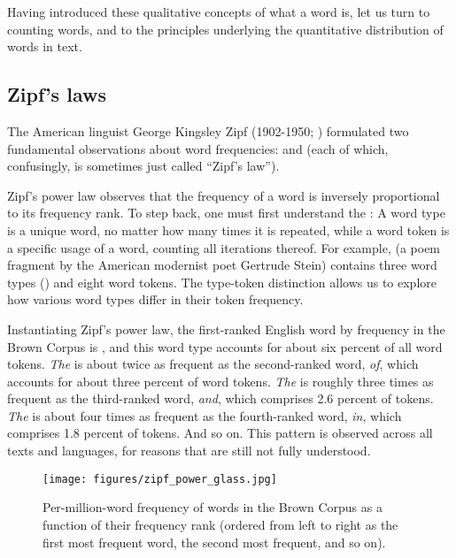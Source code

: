   Having
introduced these qualitative concepts of what a word is, let us turn
to counting words, and to the principles underlying the quantitative
distribution of words in text.

\subsection{Zipf's laws}
\label{sec:zipf}

The American linguist George Kingsley Zipf (1902-1950;
\citealt{Zipf:1932}) formulated two fundamental observations about
word frequencies:  and  (each of which, confusingly, is sometimes just called
``Zipf's law'').

Zipf's power law observes that the frequency of a word is inversely
proportional to its frequency rank.  To step back, one must first
understand the : A word type is a
unique word, no matter how many times it is repeated, while a word token is a specific usage
of a word, counting all iterations thereof.  For example,  (a poem fragment by the American modernist
poet Gertrude Stein) contains three word types ()
and eight word tokens.  The type-token distinction allows us to
explore how various word types differ in their token frequency.

Instantiating Zipf's power law, the first-ranked English word by
frequency in the Brown Corpus is , and this word type
accounts for about six percent of all word tokens.  \textit{The} is about
twice as frequent as the second-ranked word, \textit{of}, which
accounts for about three percent of word tokens.  \textit{The} is roughly three
times as frequent as the third-ranked word, \textit{and}, which
comprises 2.6 percent of tokens.  \textit{The} is about four times as
frequent as the fourth-ranked word, \textit{in}, which comprises 1.8 percent of tokens.  And so on.  This pattern is observed across all texts and languages, for reasons that are still not fully understood.

\begin{figure}[htbp]
  \texttt{[image: figures/zipf\_power\_glass.jpg]}
  \caption{Per-million-word frequency of words in the Brown Corpus as a function of their frequency rank (ordered from left to right as the first most frequent word, the second most frequent, and so on).}
  \label{fig:zipfpower}
  \end{figure}
  
